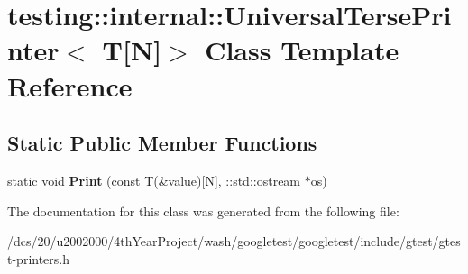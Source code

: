 \hypertarget{classtesting_1_1internal_1_1UniversalTersePrinter_3_01T[N]_4}{}\section{testing\+:\+:internal\+:\+:Universal\+Terse\+Printer$<$ T\mbox{[}N\mbox{]}$>$ Class Template Reference}
\label{classtesting_1_1internal_1_1UniversalTersePrinter_3_01T[N]_4}
\subsection*{Static Public Member Functions}
\begin{DoxyCompactItemize}
\item 
\mbox{\label{classtesting_1_1internal_1_1UniversalTersePrinter_3_01T[N]_4_a9e0ceb62fda7dc46ebcf5f911e459a49}} 
static void {\bfseries Print} (const T(\&value)\mbox{[}N\mbox{]}, \+::std\+::ostream $\ast$os)
\end{DoxyCompactItemize}


The documentation for this class was generated from the following file\+:\begin{DoxyCompactItemize}
\item 
/dcs/20/u2002000/4th\+Year\+Project/wash/googletest/googletest/include/gtest/gtest-\/printers.\+h\end{DoxyCompactItemize}
